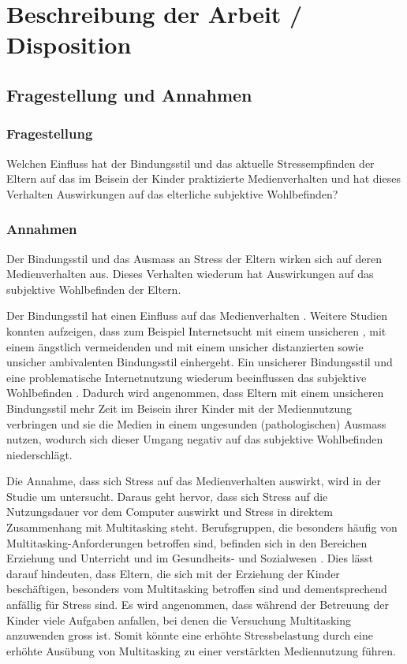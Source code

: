 \section{Beschreibung der Arbeit / Disposition}
\subsection{Fragestellung und Annahmen}
\subsubsection{Fragestellung}
Welchen Einfluss hat der Bindungsstil und das aktuelle Stressempfinden der Eltern auf das im Beisein der Kinder praktizierte Medienverhalten und hat dieses Verhalten Auswirkungen auf das elterliche subjektive Wohlbefinden?
\subsubsection{Annahmen}
Der Bindungsstil und das Ausmass an Stress der Eltern wirken sich auf deren Medienverhalten aus. Dieses Verhalten wiederum hat Auswirkungen auf das subjektive Wohlbefinden der Eltern.

Der Bindungsstil hat einen Einfluss auf das Medienverhalten \cite{Lin2015, Monacis2017}. Weitere Studien konnten aufzeigen, dass zum Beispiel Internetsucht mit einem unsicheren \cite{Lin2011, Severino2013}, mit einem ängstlich vermeidenden \cite{Shin2011} und mit einem unsicher distanzierten sowie unsicher ambivalenten Bindungsstil \cite{Odaci2014} einhergeht. Ein unsicherer Bindungsstil und eine problematische Internetnutzung wiederum beeinflussen das subjektive Wohlbefinden \cite{Odaci2014}.	 
Dadurch wird angenommen, dass Eltern mit einem unsicheren Bindungsstil mehr Zeit im Beisein ihrer Kinder mit der Mediennutzung verbringen und sie die Medien in einem ungesunden (pathologischen) Ausmass nutzen, wodurch sich dieser Umgang negativ auf das subjektive Wohlbefinden niederschlägt.  

Die Annahme, dass sich Stress auf das Medienverhalten auswirkt, wird in der Studie um  untersucht. Daraus geht hervor, dass sich Stress auf die Nutzungsdauer vor dem Computer auswirkt und Stress in direktem Zusammenhang mit Multitasking steht. Berufsgruppen, die besonders häufig von Multitasking-Anforderungen betroffen sind, befinden sich in den Bereichen Erziehung und Unterricht und im Gesundheits- und Sozialwesen \cite{Lohmann2012}. Dies lässt darauf hindeuten, dass Eltern, die sich mit der Erziehung der Kinder beschäftigen, besonders vom Multitasking betroffen sind und dementsprechend anfällig für Stress sind. Es wird angenommen, dass während der Betreuung der Kinder viele Aufgaben anfallen, bei denen die Versuchung Multitasking anzuwenden gross ist. Somit könnte eine erhöhte Stressbelastung durch eine erhöhte Ausübung von Multitasking zu einer verstärkten Mediennutzung führen.

